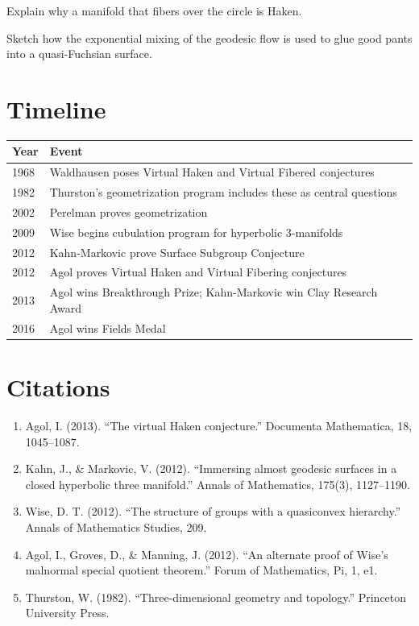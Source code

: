 \begin{exercise}[Intermediate]
Explain why a manifold that fibers over the circle is Haken.
\end{exercise}

\begin{exercise}[Advanced]
Sketch how the exponential mixing of the geodesic flow is used to glue good pants into a quasi-Fuchsian surface.
\end{exercise}

\section{Timeline}

\begin{tabularx}{\linewidth}{lX}
\toprule
\textbf{Year} & \textbf{Event} \\ \midrule
1968 & Waldhausen poses Virtual Haken and Virtual Fibered conjectures \\ 
1982 & Thurston's geometrization program includes these as central questions \\ 
2002 & Perelman proves geometrization \\ 
2009 & Wise begins cubulation program for hyperbolic 3-manifolds \\ 
2012 & Kahn-Markovic prove Surface Subgroup Conjecture \\ 
2012 & Agol proves Virtual Haken and Virtual Fibering conjectures \\ 
2013 & Agol wins Breakthrough Prize; Kahn-Markovic win Clay Research Award \\ 
2016 & Agol wins Fields Medal \\ \bottomrule
\end{tabularx}

\section{Citations}

\begin{enumerate}
\item Agol, I. (2013). ``The virtual Haken conjecture.'' Documenta Mathematica, 18, 1045--1087.
\item Kahn, J., \& Markovic, V. (2012). ``Immersing almost geodesic surfaces in a closed hyperbolic three manifold.'' Annals of Mathematics, 175(3), 1127--1190.
\item Wise, D. T. (2012). ``The structure of groups with a quasiconvex hierarchy.'' Annals of Mathematics Studies, 209.
\item Agol, I., Groves, D., \& Manning, J. (2012). ``An alternate proof of Wise's malnormal special quotient theorem.'' Forum of Mathematics, Pi, 1, e1.
\item Thurston, W. (1982). ``Three-dimensional geometry and topology.'' Princeton University Press.
\end{enumerate}
